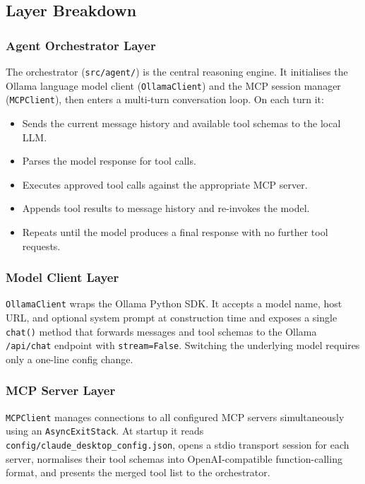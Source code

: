 \documentclass[12pt, a4paper]{article}
\newcommand{\code}[1]{\texttt{\small\color{darwinblue}#1}}
\begin{document}
\subsection{Layer Breakdown}

\subsubsection{Agent Orchestrator Layer}

The orchestrator (\code{src/agent/}) is the central reasoning engine. It initialises the Ollama language model client (\code{OllamaClient}) and the MCP session manager (\code{MCPClient}), then enters a multi-turn conversation loop. On each turn it:

\begin{itemize}[leftmargin=2em, itemsep=3pt]
    \item Sends the current message history and available tool schemas to the local LLM.
    \item Parses the model response for tool calls.
    \item Executes approved tool calls against the appropriate MCP server.
    \item Appends tool results to message history and re-invokes the model.
    \item Repeats until the model produces a final response with no further tool requests.
\end{itemize}

\subsubsection{Model Client Layer}

\code{OllamaClient} wraps the Ollama Python SDK. It accepts a model name, host URL, and optional system prompt at construction time and exposes a single \code{chat()} method that forwards messages and tool schemas to the Ollama \code{/api/chat} endpoint with \code{stream=False}. Switching the underlying model requires only a one-line config change.

\subsubsection{MCP Server Layer}

\code{MCPClient} manages connections to all configured MCP servers simultaneously using an \code{AsyncExitStack}. At startup it reads \code{config/claude\_desktop\_config.json}, opens a stdio transport session for each server, normalises their tool schemas into OpenAI-compatible function-calling format, and presents the merged tool list to the orchestrator.
\end{document}
